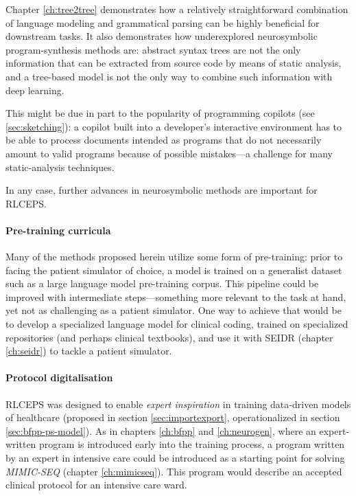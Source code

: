 Chapter \ref{ch:tree2tree} demonstrates how a relatively straightforward combination of language modeling and grammatical parsing can be highly beneficial for downstream tasks.
It also demonstrates how underexplored neurosymbolic program-synthesis methods are: abstract syntax trees are not the only information that can be extracted from source code by means of static analysis, and a tree-based model is not the only way to combine such information with deep learning.

This might be due in part to the popularity of programming copilots (see \ref{sec:sketching}): a copilot built into a developer's interactive environment has to be able to process documents intended as programs that do not necessarily amount to valid programs because of possible mistakes—a challenge for many static-analysis techniques.

In any case, further advances in neurosymbolic methods are important for RLCEPS.

\paragraph{Pre-training curricula}

Many of the methods proposed herein utilize some form of pre-training: prior to facing the patient simulator of choice, a model is trained on a generalist dataset such as a large language model pre-training corpus.
This pipeline could be improved with intermediate steps—something more relevant to the task at hand, yet not as challenging as a patient simulator.
One way to achieve that would be to develop a specialized language model for clinical coding, trained on specialized repositories (and perhaps clinical textbooks), and use it with SEIDR (chapter \ref{ch:seidr}) to tackle a patient simulator.

\paragraph{Protocol digitalisation}

RLCEPS was designed to enable \emph{expert inspiration} in training data-driven models of healthcare (proposed in section \ref{sec:importexport}, operationalized in section \ref{sec:bfpp-ps-model}).
As in chapters \ref{ch:bfpp} and \ref{ch:neurogen}, where an expert-written program is introduced early into the training process, a program written by an expert in intensive care could be introduced as a starting point for solving \emph{MIMIC-SEQ} (chapter \ref{ch:mimicseq}).
This program would describe an accepted clinical protocol for an intensive care ward.

